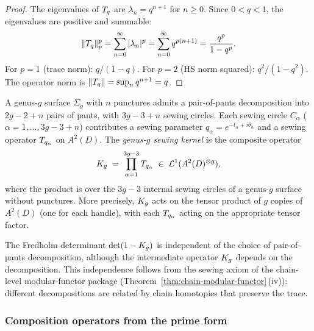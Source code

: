 \begin{proof}
The eigenvalues of $T_q$ are $\lambda_n = q^{n+1}$ for
$n \geq 0$. Since $0 < q < 1$, the eigenvalues are positive
and summable:
\[
\|T_q\|_p^p
= \sum_{n=0}^{\infty} |\lambda_n|^p
= \sum_{n=0}^{\infty} q^{p(n+1)}
= \frac{q^p}{1-q^p}.
\]
For $p = 1$ (trace norm): $q/(1-q)$.
For $p = 2$ (HS norm squared): $q^2/(1-q^2)$.
The operator norm is $\|T_q\| = \sup_n q^{n+1} = q$.
\end{proof}

\begin{definition}%
\label{def:thqg-X-genus-g-sewing}%
%
A genus-$g$ surface $\Sigma_g$ with $n$ punctures admits a
pair-of-pants decomposition into $2g - 2 + n$ pairs of pants,
with $3g - 3 + n$ sewing circles. Each sewing circle
$C_\alpha$ ($\alpha = 1, \ldots, 3g-3+n$) contributes a sewing
parameter $q_\alpha = e^{-t_\alpha + i\theta_\alpha}$ and
a sewing operator $T_{q_\alpha}$ on $A^2(D)$.
The \emph{genus-$g$ sewing kernel} is the composite operator
\begin{equation}\label{eq:thqg-X-genus-g-kernel}
K_g
\;=\;
\prod_{\alpha=1}^{3g-3}
T_{q_\alpha}
\;\in\;
\mathcal{L}^1(A^2(D)^{\otimes g}),
\end{equation}
where the product is over the $3g-3$ internal sewing circles
of a genus-$g$ surface without punctures.
More precisely, $K_g$ acts on the tensor product of
$g$ copies of $A^2(D)$ (one for each handle),
with each $T_{q_\alpha}$ acting on the appropriate
tensor factor.
\end{definition}

\begin{remark}%
\label{rem:thqg-X-pants-independence}%
%
The Fredholm determinant $\det(1 - K_g)$ is independent
of the choice of pair-of-pants decomposition, although the
intermediate operator $K_g$ depends on the decomposition.
This independence follows from the sewing axiom of the
chain-level modular-functor package
(Theorem~\ref{thm:chain-modular-functor}\,(iv)):
different decompositions are related by chain homotopies
that preserve the trace.
\end{remark}

\subsubsection{Composition operators from the prime form}

